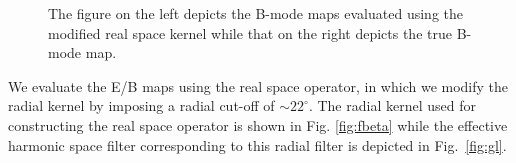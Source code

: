 \documentclass[12pt]{article}
\begin{document}
\begin{figure}[h]
\centering
{}
\caption{The figure on the left depicts the B-mode maps evaluated using the modified real space kernel while that on the right depicts the true B-mode map.}
\label{fig:compare_B}
\end{figure}
%
We evaluate the E/B maps using the real space operator, in which we modify the radial kernel by imposing a radial cut-off of $\sim 22^{\circ}$.  The radial kernel used for constructing the real space operator is shown in Fig. \ref{fig:fbeta} while the effective harmonic space filter corresponding to this radial filter is depicted in Fig.~\ref{fig:gl}. 
\end{document}
